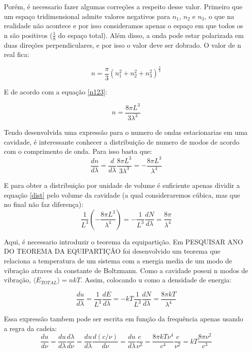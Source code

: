 \documentclass[11pt]{article}
\begin{document}
Porém, é necessario fazer algumas correções a respeito desse valor.
Primeiro que um espaço tridimensional admite valores negativos para
\(n_1\), \(n_2\) e \(n_3\), o que na realidade não acontece e por isso
consideramos apenas o espaço em que todos os n são positivos
(\(\frac{1}{8}\) do espaço total). Além disso, a onda pode estar
polarizada em duas direções perpendiculares, e por isso o valor deve ser
dobrado. O valor de n real fica:

\[
n=\frac{\pi}{3} (n_1^2+n_2^2+n_3^2)^{\frac{3}{2}}
\]

E de acordo com a equação \ref{n123}:

\[
n=\frac{8 \pi L^3}{3 \lambda^3}
\]

Tendo desenvolvida uma expressão para o numero de ondas estacionarias em
uma cavidade, é interessante conhecer a distribuição de numero de modos
de acordo com o comprimento de onda. Para isso basta que: \[
\begin{equation}
\frac{dn}{d\lambda}=\frac{d}{d\lambda}\frac{8 \pi L^3}{3 \lambda^3} = -\frac{8 \pi L^3}{ \lambda^4}
\label{dist} \tag{2}
\end{equation}
\]

E para obter a distribuição por unidade de volume é suficiente apenas
dividir a equação \ref{dist} pelo volume da cavidade (a qual
consideraremos cúbica, mas que no final não faz diferença): \[
\frac{1}{L^3}(-\frac{8 \pi L^3}{ \lambda^4})=-\frac{1}{L^3}\frac{dN}{d\lambda}=\frac{8\pi}{\lambda^4}
\]

Aqui, é necessario introduzir o teorema da equipartição. Em PESQUISAR
ANO DO TEOREMA DA EQUIPARTIÇÂO foi desenvolvido um teorema que relaciona
a temperatura de um sistema com a energia media de um modo de vibração
atraves da constante de Boltzmann. Como a cavidade possui n modos de
vibração, \(\langle E_{TOTAL} \rangle=nkT\). Assim, colocando u como a
densidade de energia:

\[
\frac{du}{d\lambda}=\frac{1}{L^3}\frac{dE}{d\lambda}=-kT\frac{1}{L^3}\frac{dN}{d\lambda} = \frac{8 \pi kT}{\lambda^4}
\]

Essa expressão tambem pode ser escrita em função da frequência apenas
usando a regra da cadeia: \[
\frac{du}{d\nu}=\frac{du}{d\lambda}\frac{d\lambda}{d \nu}=\frac{du}{d\lambda}\frac{d(c/\nu)}{d \nu}=\frac{du}{d\lambda}\frac{c}{\nu^2}=\frac{8 \pi kT\nu^4}{c^4}\frac{c}{\nu^2}=kT\frac{8 \pi \nu^2}{c^3}
\]
\end{document}
